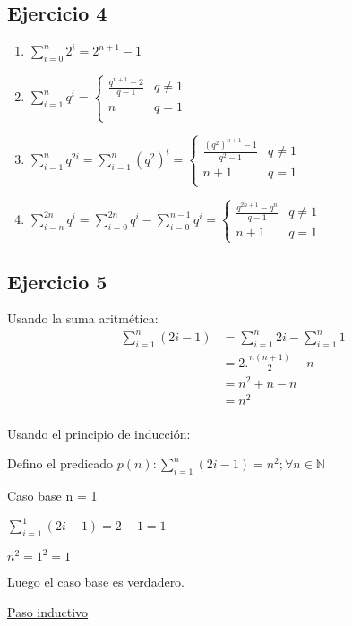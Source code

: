 \subsection{Ejercicio 4}
\begin{enumerate}[label=(\alph*)]
    \item $\sum_{i=0}^{n}2^i = 2^{n+1}-1$
    \item $\sum_{i=1}^{n}q^i = \begin{cases}
        \frac{q^{n+1}-2}{q-1} & q \neq 1 \\
        n & q = 1 \\
    \end{cases}$
    \item $\sum_{i=1}^{n}q^{2i} = \sum_{i=1}^{n}(q^2)^i =  \begin{cases}
        \frac{(q^2)^{n+1}-1}{q^2-1} & q \neq 1 \\
        n+1 & q = 1 \\
    \end{cases}$
    \item $\sum_{i=n}^{2n}q^{i} = \sum_{i=0}^{2n}q^{i} - \sum_{i=0}^{n-1}q^{i} = \begin{cases}
        \frac{q^{2n+1} - q^n}{q-1} & q \neq 1 \\
        n+1 & q =1
    \end{cases}$
\end{enumerate}

\subsection{Ejercicio 5}
Usando la suma aritmética:
\begin{align*}
    \sum_{i=1}^{n}(2i-1) &= \sum_{i=1}^{n}2i - \sum_{i=1}^{n}1 \\
    &= 2.\frac{n(n+1)}{2} - n \\
    &= n^2 + n - n \\
    &= n^2\\
\end{align*}

Usando el principio de inducción:

Defino el predicado $p(n): \sum_{i=1}^{n}(2i-1) = n^2; \forall n \in \mathbb{N}$

\underline{Caso base n = 1}

$\sum_{i=1}^{1}(2i-1) = 2 - 1 = 1$

$n^2 = 1^2 = 1$

Luego el caso base es verdadero.

\underline{Paso inductivo}

